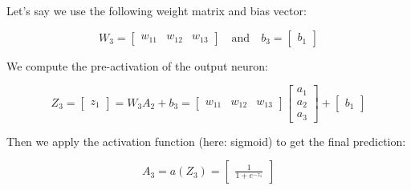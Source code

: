 \documentclass[11pt]{article}
\begin{document}
Let’s say we use the following weight matrix and bias vector:

\[
W_3 = 
\begin{bmatrix}
w_{11} & w_{12} & w_{13}
\end{bmatrix}
\quad \text{and} \quad
b_3 = 
\begin{bmatrix}
b_1
\end{bmatrix}
\]

We compute the pre-activation of the output neuron:

\[
Z_3 = 
\begin{bmatrix}
z_1
\end{bmatrix}
= W_3 A_2 + b_3 = 
\begin{bmatrix}
w_{11} & w_{12} & w_{13}
\end{bmatrix}
\begin{bmatrix}
a_1 \\
a_2 \\
a_3
\end{bmatrix}
+
\begin{bmatrix}
b_1
\end{bmatrix}
\]

Then we apply the activation function (here: sigmoid) to get the final prediction:

\[
A_3 = a(Z_3) =
\begin{bmatrix}
\frac{1}{1 + e^{-z_1}}
\end{bmatrix}
\]
\end{document}
